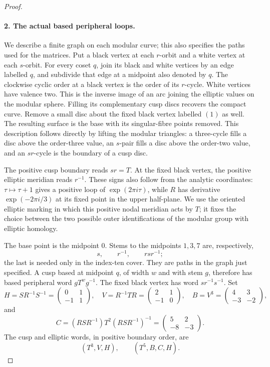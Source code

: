 \begin{proof}
\paragraph{2. The actual based peripheral loops.}
We describe a finite graph on each modular curve; this also specifies
the paths used for the matrices.  Put a black vertex at each
$r$-orbit and a white vertex at each $s$-orbit.  For every coset $q$,
join its black and white vertices by an edge labelled $q$, and
subdivide that edge at a midpoint also denoted by $q$.  The clockwise
cyclic order at a black vertex is the order of its $r$-cycle.  White
vertices have valence two.  This is the inverse image of an arc
joining the elliptic values on the modular sphere.  Filling its
complementary cusp discs recovers the compact curve.  Remove a
small disc about the fixed black vertex labelled $(1)$ as well.
The resulting surface is the base with its singular-fibre points
removed.  This description follows directly by lifting the modular
triangles: a three-cycle fills a disc above the order-three value,
an $s$-pair fills a disc above the order-two value, and an $sr$-cycle
is the boundary of a cusp disc.

The positive cusp boundary reads $sr=T$.  At the fixed black vertex,
the positive elliptic meridian reads $r^{-1}$.  These signs also
follow from the analytic coordinates: $\tau\mapsto\tau+1$ gives
a positive loop of $\exp(2\pi i\tau)$, while $R$ has derivative
$\exp(-2\pi i/3)$ at its fixed point in the upper half-plane.
We use the oriented elliptic marking in which this positive nodal
meridian acts by $T$; it fixes the choice between the two possible
outer identifications of the modular group with elliptic homology.

The base point is the midpoint $0$.  Stems to the midpoints $1,3,7$
are, respectively,
\[
 s,\qquad r^{-1},\qquad rsr^{-1};
\]
the last is needed only in the index-ten cover.  They are paths in
the graph just specified.  A cusp based at midpoint $q$, of width
$w$ and with stem $g$, therefore has based peripheral word
$gT^wg^{-1}$.  The fixed black vertex has word $sr^{-1}s^{-1}$.
Set
\begin{equation}\label{mapsD:repair:canonical-matrices}
 H=SR^{-1}S^{-1}=\begin{pmatrix}0&1\\-1&1\end{pmatrix},\quad
 V=R^{-1}TR=\begin{pmatrix}2&1\\-1&0\end{pmatrix},\quad
 B=V^3=\begin{pmatrix}4&3\\-3&-2\end{pmatrix},
\end{equation}
and
\[
 C=(RSR^{-1})T^2(RSR^{-1})^{-1}
   =\begin{pmatrix}5&2\\-8&-3\end{pmatrix}.
\]
The cusp and elliptic words, in positive boundary order, are
\[
 (T^3,V,H),\qquad (T^5,B,C,H).
\]


\end{proof}
